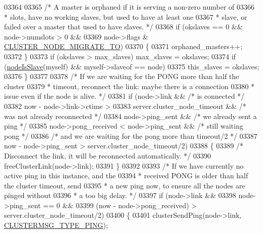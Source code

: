 \begin{DoxyCode}
{{{{{{{{{{{{{{{{{{{{{{{{{{{{{{{{{{{{{{{{{{{{{{{{{{{{{{{{{{{{03364 
03365             \textcolor{comment}{/* A master is orphaned if it is serving a non-zero number of}
03366 \textcolor{comment}{             * slots, have no working slaves, but used to have at least one}
03367 \textcolor{comment}{             * slave, or failed over a master that used to have slaves. */}
03368             \textcolor{keywordflow}{if} (okslaves == 0 && node->numslots > 0 &&
03369                 node->flags & \hyperlink{cluster_8h_a1d5a62356ed9f5986613c2315a358119}{CLUSTER\_NODE\_MIGRATE\_TO})
03370             \{
03371                 orphaned\_masters++;
03372             \}
03373             \textcolor{keywordflow}{if} (okslaves > max\_slaves) max\_slaves = okslaves;
03374             \textcolor{keywordflow}{if} (\hyperlink{cluster_8h_a3c99881f6892130c902b42b1f84a0e11}{nodeIsSlave}(myself) && myself->slaveof == node)
03375                 this\_slaves = okslaves;
03376         \}
03377 
03378         \textcolor{comment}{/* If we are waiting for the PONG more than half the cluster}
03379 \textcolor{comment}{         * timeout, reconnect the link: maybe there is a connection}
03380 \textcolor{comment}{         * issue even if the node is alive. */}
03381         \textcolor{keywordflow}{if} (node->link && \textcolor{comment}{/* is connected */}
03382             now - node->link->ctime >
03383             server.cluster\_node\_timeout && \textcolor{comment}{/* was not already reconnected */}
03384             node->ping\_sent && \textcolor{comment}{/* we already sent a ping */}
03385             node->pong\_received < node->ping\_sent && \textcolor{comment}{/* still waiting pong */}
03386             \textcolor{comment}{/* and we are waiting for the pong more than timeout/2 */}
03387             now - node->ping\_sent > server.cluster\_node\_timeout/2)
03388         \{
03389             \textcolor{comment}{/* Disconnect the link, it will be reconnected automatically. */}
03390             freeClusterLink(node->link);
03391         \}
03392 
03393         \textcolor{comment}{/* If we have currently no active ping in this instance, and the}
03394 \textcolor{comment}{         * received PONG is older than half the cluster timeout, send}
03395 \textcolor{comment}{         * a new ping now, to ensure all the nodes are pinged without}
03396 \textcolor{comment}{         * a too big delay. */}
03397         \textcolor{keywordflow}{if} (node->link &&
03398             node->ping\_sent == 0 &&
03399             (now - node->pong\_received) > server.cluster\_node\_timeout/2)
03400         \{
03401             clusterSendPing(node->link, \hyperlink{cluster_8h_aeb8a936505e22f64e5039523a3c96d4c}{CLUSTERMSG\_TYPE\_PING});
}}}}}}}}}}}}}}}}}}}}}}}}}}}}}}}}}}}}}}}}}}}}}}}}}}}}}}}}}}}}
\end{DoxyCode}

